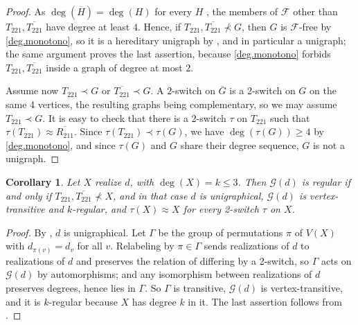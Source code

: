 \documentclass[11pt]{article}
\newtheorem{corollary}[corollary]{Corollary}
\begin{document}
\begin{proof}
	As $\deg(\overline{H})=\deg(H)$ for every $H$ \cite{pastine20252}, the
	members of $\mathcal{F}$ other than $T_{221},\overline{T_{221}}$ have
	degree at least $4$. Hence, if $T_{221},\overline{T_{221}}\not\prec G$,
	then $G$ is $\mathcal{F}$-free by \eqref{deg.monotono}, so it is a
	hereditary unigraph by , and in particular a
	unigraph; the same argument proves the last assertion, because
	\eqref{deg.monotono} forbids $T_{221},\overline{T_{221}}$ inside a
	graph of degree at most $2$.
	
	Assume now $T_{221}\prec G$ or $\overline{T_{221}}\prec G$. A 2-switch
	on $\overline{G}$ is a 2-switch on $G$ on the same 4 vertices, the
	resulting graphs being complementary, so we may assume
	$T_{221}\prec G$. It is easy to check that there is a 2-switch $\tau$ on $T_{221}$ such that $\tau(T_{221})\approx \overline{R_{211}}$. Since $\tau(T_{221})\prec\tau(G)$, we have 
	$\deg(\tau(G))\geq 4$ by
	\eqref{deg.monotono}, and since $\tau(G)$ and $G$ share their degree
	sequence, $G$ is not a unigraph.
\end{proof}

\begin{corollary}
	\label{G(d).transitivo}
	Let $X$ realize $d$, with $\deg(X)=k\leq 3$. Then $\mathcal{G}(d)$ is regular if and
	only if $T_{221},\overline{T_{221}}\not\prec X$, and in that case $d$ is unigraphical,
	$\mathcal{G}(d)$ is vertex-transitive and $k$-regular, and $\tau(X)\approx X$ for every
	2-switch $\tau$ on $X$.
\end{corollary}

\begin{proof}
	By , $d$ is unigraphical. Let $\Gamma$ be the
	group of permutations $\pi$ of $V(X)$ with $d_{\pi(v)}=d_v$ for all
	$v$. Relabeling by $\pi\in\Gamma$ sends realizations of $d$ to
	realizations of $d$ and preserves the relation of differing by a
	2-switch, so $\Gamma$ acts on $\mathcal{G}(d)$ by automorphisms; and
	any isomorphism between realizations of $d$ preserves degrees, hence
	lies in $\Gamma$. So $\Gamma$ is transitive, $\mathcal{G}(d)$ is
	vertex-transitive, and it is $k$-regular because $X$ has degree $k$ in
	it. The last assertion follows from .
\end{proof}
\end{document}
